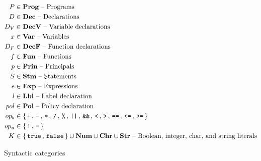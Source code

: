 \begin{table}[h!]
  \begin{align*}
    P       & \in \mathbf{Prog} \text{ -- Programs}\\
    D       & \in \mathbf{Dec} \text{ -- Declarations}\\
    D_V     & \in \mathbf{DecV} \text{ -- Variable declarations}\\
    x       & \in \mathbf{Var} \text{ -- Variables}\\
    D_F     & \in \mathbf{DecF} \text{ -- Function declarations}\\
    f       & \in \mathbf{Fun} \text{ -- Functions}\\
    p       & \in \mathbf{Prin} \text{ -- Principals}\\
    S       & \in \mathbf{Stm} \text{ -- Statements}\\
    e       & \in \mathbf{Exp} \text{ -- Expressions}\\
    l       & \in \mathbf{Lbl} \text{ -- Label declaration}\\
    pol     & \in \mathbf{Pol} \text{ -- Policy declaration}\\
    op_b    & \in \{ \, \texttt{+} \, ,  \, \texttt{-} \, ,  \, \texttt{*} \, ,  \, \texttt{/} \, ,  \, \texttt{\%} \, ,  \, \texttt{||} \, ,  \, \texttt{\&\&} \, ,  \, \texttt{<} \, ,  \, \texttt{>} \, ,  \, \texttt{==} \, ,  \, \texttt{<=} \, ,  \, \texttt{>=} \, \} \\
    op_u    & \in \{ \, \texttt{!} \, ,  \, \texttt{-} \, \} \\
    K       & \in \{ \, \texttt{true} \,, \, \texttt{false} \, \} \cup \mathbf{Num} \cup \mathbf{Chr} \cup \mathbf{Str} \text{ -- Boolean, integer, char, and string literals}
  \end{align*}
  \caption{Syntactic categories}
  \label{ctif:categories}
\end{table}

